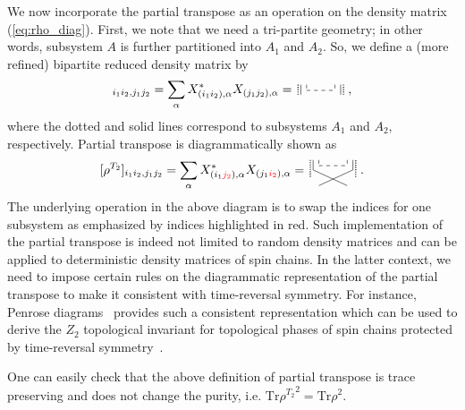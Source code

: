 \documentclass[aps,pra,groupedaddress,onecolumn,notitlepage,superscriptaddress,10pt]{revtex4-1}
\newcommand{\rT}{{\rho^{T_2}} }
\newcommand{\Tr}{\text{Tr}}
\begin{document}
We now incorporate the partial transpose as an operation on the density matrix (\ref{eq:rho_diag}).
First, we note that we need a tri-partite geometry; in other words, subsystem $A$ is further partitioned into $A_1$ and $A_2$. So, we define a (more refined) bipartite reduced density matrix by
\begin{align}
    [\rho]_{i_1i_2,j_1j_2}= \sum_\alpha X^\ast_{(i_1i_2),\alpha}X_{(j_1j_2),\alpha}
    =
    \,
    \tikz[scale=0.8,baseline=-0.5ex]{
    \draw[dashed] (0,0.2)-- (0,0);
    \draw[dashed] (0,0) -- (1,0);
    \draw[dashed]  (1,0.2) -- (1,0);
    \draw (-0.2,0.2)-- (-0.2,-0.15);
    \draw (1.2,-0.15)-- (1.2,0.2);
    \draw[densely dotted,thick] (-0.3,0.2)-- (-0.3,-0.15);
    \draw[densely dotted,thick] (1.3,-0.15)-- (1.3,0.2);
    }\ ,
\end{align}
where the dotted and solid lines correspond to subsystems $A_1$ and $A_2$, respectively. 
Partial transpose is diagrammatically shown as
\begin{align}
	\label{eq:rT_diag}
    [\rho^{T_2}]_{i_1i_2,j_1j_2}= \sum_\alpha X^\ast_{(i_1\textcolor{red}{j_2}),\alpha}X_{(j_1\textcolor{red}{i_2}),\alpha}
    =\,
    \tikz[scale=0.8,baseline=-1.5ex]{
    \draw[dashed] (0,0.2)-- (0,0);
    \draw[dashed] (0,0) -- (1,0);
    \draw[dashed]  (1,0.2) -- (1,0);
    \draw (-0.2,0.2)-- (-0.2,-0.15);
    \draw (-0.2,-0.15)-- (1.,-0.7);
    \draw (1.2,-0.15)-- (1.2,0.2);
    \draw (1.2,-0.15)-- (0,-0.7);
    \draw[densely dotted,thick] (-0.3,0.2)-- (-0.3,-0.4);
    \draw[densely dotted,thick] (1.3,-0.4)-- (1.3,0.2);
    }\ .
\end{align}
The underlying operation in the above diagram is to swap the indices for one subsystem as emphasized by indices highlighted in red. Such implementation of the partial transpose is indeed not limited to random density matrices and can be applied to deterministic density matrices of spin chains. In the latter context, we need to impose certain rules on the diagrammatic representation of the partial transpose to make it consistent with time-reversal symmetry. For instance, Penrose diagrams~\cite{1996PhRvD..54.2664D,Rovelli:2004tv}
provides such a consistent representation which can be used  to derive the $Z_2$ topological invariant for topological phases of spin chains protected by time-reversal symmetry~\cite{SMR20}.

One can easily check that the above definition of partial transpose is trace preserving and does not change the purity, i.e. $\Tr\rT^2=\Tr\rho^2$.
\end{document}
